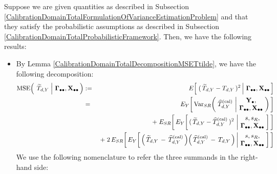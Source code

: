 \vskip 0.1cm
\noindent
Suppose we are given quantities as described in Subsection
\ref{CalibrationDomainTotalFormulationOfVarianceEstimationProblem}
and
that they satisfy the probabilistic assumptions as described in Subsection
\ref{CalibrationDomainTotalProbabilisticFramework}.
\vskip 0.1cm
\noindent
Then, we have the following results:
\begin{itemize}
\item
    By Lemma \ref{CalibrationDomainTotalDecompositionMSETtilde}, we have the following decomposition:
    \begin{eqnarray*}
    \MSE\!\left(\;
        \left.
        \widetilde{T}_{d,Y}
        \;\right\vert\,
        \Gdotdot,\Xobs
        \,\right)
    & := &
        E\!\left[\,
            \left.
            (\,\widetilde{T}_{d,Y} - T_{d,Y}\,)^{2}
            \,\right\vert\,
            \Gdotdot,\Xobs
            \,\right]
    \\
    & = &
        E_{Y}\!\left[\,
        \Var_{SR}\!\left(\;
            \widehat{T}^{\textnormal{(cal)}}_{d,Y}
            \,\left\vert\!
            \begin{array}{c} \Ydot, \\ \Gdotdot,\Xobs \end{array}
            \right.
            \!\!\right)
            \,\right]
    \\
    &&
        \; + \;
        E_{SR}\!\left[\,
        E_{Y}\!\left[\,
            (\,\widetilde{T}_{d,Y} - \widehat{T}^{\textnormal{(cal)}}_{d,Y}\,)^{2}
            \,\left\vert\!
            \begin{array}{c} s,s_{R}, \\ \Gdotdot,\Xobs \end{array}
            \right.
            \!\!\right]
            \,\right]
    \\
    &&
        \; + \; 2 \,
        E_{SR}\!\left[\,
        E_{Y}\!\left[\,
            \left(\,\widetilde{T}_{d,Y} \,-\, \widehat{T}^{\textnormal{(cal)}}_{d,Y}\,\right)
            \!
            \left(\,\widehat{T}^{\textnormal{(cal)}}_{d,Y} \,-\, T_{d,Y}\,\right)
            \left\vert\!
            \begin{array}{c} s,s_{R}, \\ \Gdotdot,\Xobs \end{array}
            \right.
            \!\!\right]
            \,\right]
    \end{eqnarray*}
    We use the following nomenclature to refer the three summands in the right-hand side:
    \begin{eqnarray*}

\end{eqnarray*}
\end{itemize}
